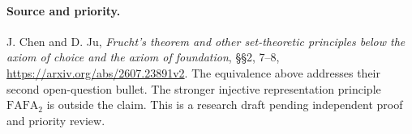 \documentclass[11pt]{article}
\begin{document}
\paragraph{Source and priority.} J. Chen and D. Ju, \emph{Frucht's theorem and other set-theoretic principles below the axiom of choice and the axiom of foundation}, §§2, 7--8, \url{https://arxiv.org/abs/2607.23891v2}. The equivalence above addresses their second open-question bullet. The stronger injective representation principle $\mathrm{FAFA}_2$ is outside the claim. This is a research draft pending independent proof and priority review.
\end{document}

